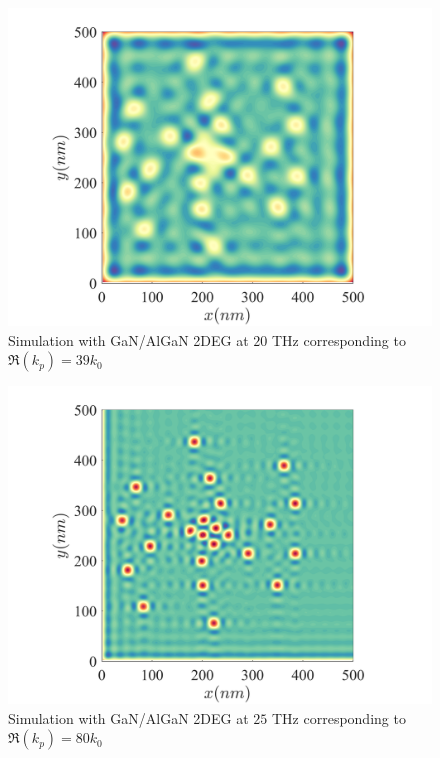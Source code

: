 \documentclass[11pt]{article}
\begin{document}
\begin{figure}[h!]
  \centering
  \includegraphics[scale=1]{free_space_sim.png}
  \caption{Simulation with GaN/AlGaN 2DEG at $20$ THz corresponding to $\Re(k_p) = 39 k_0$}
  \label{fig:sim_low}
\end{figure}

\begin{figure}[h!]
  \centering
  \includegraphics[scale=1]{plasmonic_sim.png}
  \caption{Simulation with GaN/AlGaN 2DEG at $25$ THz corresponding to $\Re(k_p) = 80 k_0$}
  \label{fig:plasmonic_sim}
\end{figure}

\clearpage %


\end{document}
